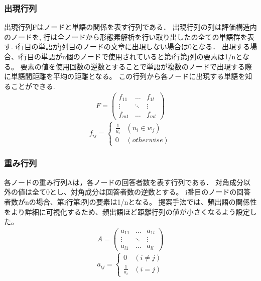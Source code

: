 \documentclass[syuuron]{kuee}
\begin{document}
			\subsubsection{出現行列}
				出現行列Fはノードと単語の関係を表す行列である．
				出現行列の列は評価構造内のノードを, 行は全ノードから形態素解析を行い取り出したの全ての単語群を表す. 
				i行目の単語がj列目のノードの文章に出現しない場合は0となる．
				出現する場合、i行目の単語がn個のノードで使用されていると第i行第j列の要素は1/nとなる。
				要素の値を使用回数の逆数とすることで単語が複数のノードで出現する際に単語間距離を平均の距離となる。
				この行列から各ノードに出現する単語を知ることができる. 
				\begin{eqnarray}
				 F = \left(
				    \begin{array}{cccc}
				    	f_{11} & \ldots & f_{1l} \\
				    	\vdots & \ddots & \vdots \\
				    	f_{m1} & \ldots & f_{ml}
					\end{array}
				 \right)
				\end{eqnarray}	
				\[
				  f_{ij} = \left\{ \begin{array}{ll}
				    \frac{1}{u_i} & (n_i \in w_j) \\
				    0 & (otherwise)
				  \end{array} \right.
				\]
				
			\subsubsection{重み行列}
				各ノードの重み行列Aは，各ノードの回答者数を表す行列である．
				対角成分以外の値は全て0とし、対角成分は回答者数の逆数とする。
				i番目のノードの回答者数がnの場合、第i行第i列の要素は1/nとなる。
				提案手法では、頻出語の関係性をより詳細に可視化するため、頻出語ほど距離行列の値が小さくなるよう設定した。
				\begin{eqnarray}
				 A = \left(
				    \begin{array}{cccc}
				    	a_{11} & \ldots & a_{1l} \\
				    	\vdots & \ddots & \vdots \\
				    	a_{l1} & \ldots & a_{ll}
					\end{array}
				 \right)
				\end{eqnarray}
				\[
				  a_{ij} = \left\{ \begin{array}{ll}
				     0 & (i ≠ j) \\
				     \frac{1}{a_i} & (i = j)
				  \end{array} \right.
				\]
				
\end{document}
